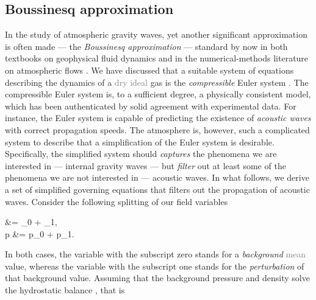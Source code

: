 \documentclass[../main.tex]{subfiles}
\begin{document}
\subsection{Boussinesq approximation}
\label{sec:BOUSSINESQ}

In the study of atmospheric gravity waves, yet another significant approximation is often made — the \emph{Boussinesq approximation} — standard by now in both textbooks on geophysical fluid dynamics \autocite{vallisAtmosphericOceanicFluid2017,holtonIntroductionDynamicMeteorology2013} and in the numerical-methods literature on atmospheric flows \autocite{durranNumericalMethodsFluid2010,teixeiraPhysicsOrographicGravity2014}. 
We have discussed that a suitable system of equations describing the dynamics of a \textcolor{gray}{dry ideal} gas is the \emph{compressible} Euler system . The compressible Euler system is, to a sufficient degree, a physically consistent model, which has been authenticated by solid agreement with experimental data. For instance, the Euler system is capable of predicting the existence of \emph{acoustic waves} with correct propagation speeds. 
The atmosphere is, however, such a complicated system to describe that a simplification of the Euler system is desirable. Specifically, the simplified system should \emph{captures} the phenomena we are interested in --- internal gravity waves --- but \emph{filter} out at least some of the phenomena we are not interested in --- acoustic waves. In what follows, we derive a set of simplified governing equations that filters out the propagation of acoustic waves. 
Consider the following splitting of our field variables

\begin{equations}[columns,*]
	\rho &= \rho_0 + \rho_{1},\\
	p &= p_0 + p_1.
\end{equations}

In both cases, the variable with the subscript zero stands for a \emph{background} \textcolor{gray}{mean} value, whereas the variable with the subscript one stands for the \emph{perturbation} of that background value. Assuming that the background pressure and density solve the hydrostatic balance , that is 
\end{document}
